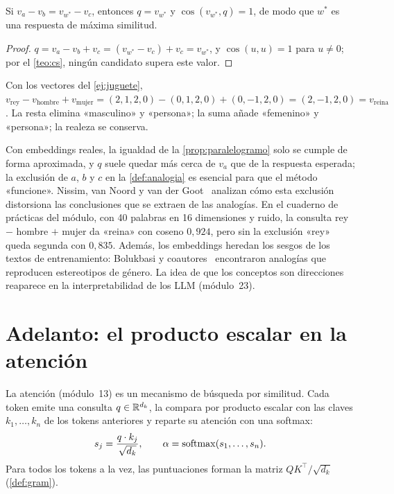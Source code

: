 \begin{proposicion}\label{prop:paralelogramo}
Si $v_a-v_b=v_{w^{*}}-v_c$, entonces $q=v_{w^{*}}$ y $\cos(v_{w^{*}},q)=1$, de modo que $w^{*}$ es una respuesta de máxima similitud.
\end{proposicion}

\begin{proof}
$q=v_a-v_b+v_c=(v_{w^{*}}-v_c)+v_c=v_{w^{*}}$, y $\cos(u,u)=1$ para $u\neq 0$; por el \cref{teo:cs}, ningún candidato supera este valor.
\end{proof}

\begin{ejemplo}
Con los vectores del \cref{ej:juguete}, $v_{\text{rey}}-v_{\text{hombre}}+v_{\text{mujer}}=(2,1,2,0)-(0,1,2,0)+(0,-1,2,0)=(2,-1,2,0)=v_{\text{reina}}$. La resta elimina «masculino» y «persona»; la suma añade «femenino» y «persona»; la realeza se conserva.
\end{ejemplo}

\begin{observacion}[Limitaciones]
Con embeddings reales, la igualdad de la \cref{prop:paralelogramo} solo se cumple de forma aproximada, y $q$ suele quedar más cerca de $v_a$ que de la respuesta esperada; la exclusión de $a$, $b$ y $c$ en la \cref{def:analogia} es esencial para que el método «funcione». Nissim, van Noord y van der Goot~\cite{nissim} analizan cómo esta exclusión distorsiona las conclusiones que se extraen de las analogías. En el cuaderno de prácticas del módulo, con 40 palabras en 16 dimensiones y ruido, la consulta rey $-$ hombre $+$ mujer da «reina» con coseno $0{,}924$, pero sin la exclusión «rey» queda segunda con $0{,}835$. Además, los embeddings heredan los sesgos de los textos de entrenamiento: Bolukbasi y coautores~\cite{bolukbasi} encontraron analogías que reproducen estereotipos de género. La idea de que los conceptos son direcciones reaparece en la interpretabilidad de los LLM (módulo~23).
\end{observacion}

\section{Adelanto: el producto escalar en la atención}

La atención (módulo~13) es un mecanismo de búsqueda por similitud. Cada token emite una consulta $q\in\mathbb{R}^{d_k}$, la compara por producto escalar con las claves $k_1,\dots,k_n$ de los tokens anteriores y reparte su atención con una softmax:
\[
s_j=\frac{q\cdot k_j}{\sqrt{d_k}},\qquad \alpha=\operatorname{softmax}(s_1,\dots,s_n).
\]
Para todos los tokens a la vez, las puntuaciones forman la matriz $QK^{\top}/\sqrt{d_k}$ (\cref{def:gram}).

